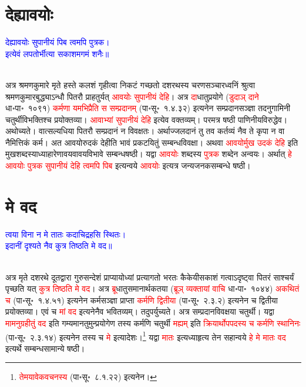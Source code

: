 \section[देह्यावयोः]{देह्यावयोः}
\centering\textcolor{blue}{देह्यावयोः सुपानीयं पिब त्वमपि पुत्रक।\nopagebreak\\
इत्येवं लपतोर्भीत्या सकाशमगमं शनैः॥}\nopagebreak\\
\\
\begin{sloppypar}\justifying\noindent\hspace{10mm} अत्र श्रमण\-कुमारे मृते हस्ते कलशं गृहीत्वा निकटं गच्छतो दशरथस्य चरण\-सञ्चार\-ध्वनिं श्रुत्वा श्रमण\-कुमार\-बुद्ध्याऽन्धौ पितरौ प्राहतुर्यत् \textcolor{red}{आवयोः सुपानीयं देहि}। अत्र \textcolor{red}{दा}\-धातु\-प्रयोगे (\textcolor{red}{डुदाञ् दाने} धा॰पा॰~१०९१) \textcolor{red}{कर्मणा यमभिप्रैति स सम्प्रदानम्‌} (पा॰सू॰~१.४.३२) इत्यनेन सम्प्रदान\-सञ्ज्ञा तदनुगामिनी चतुर्थी\-विभक्तिश्च प्रयोक्तव्या। \textcolor{red}{आवाभ्यां सुपानीयं देहि} इत्येव वक्तव्यम्। परमत्र षष्ठी पाणिनीय\-विरुद्धेव। अथोच्यते। वात्सल्य\-धिया पितरौ सम्प्रदानं न विवक्षतः। अर्थाज्जलदानं तु तव कर्तव्यं नैव ते कृपा न वा नैमित्तिकं कर्म। अत आवयोरुदकं देहीति भावं प्रकटयितुं सम्बन्ध\-विवक्षा। अथवा \textcolor{red}{आवयोर्मुख उदकं देहि} इति मुख\-शब्दस्याध्याहारेणावयवावयवि\-भावे सम्बन्ध\-षष्ठी। यद्वा \textcolor{red}{आवयोः} शब्दस्य \textcolor{red}{पुत्रक} शब्देन अन्वयः। अर्थात् \textcolor{red}{हे आवयोः पुत्रक सुपानीयं देहि त्वमपि 
पिब} इत्यन्वये \textcolor{red}{आवयोः} इत्यत्र जन्य\-जनक\-सम्बन्धे षष्ठी।\end{sloppypar}
\section[मे वद]{मे वद}
\centering\textcolor{blue}{त्वया विना न मे तातः कदाचिद्रहसि स्थितः।\nopagebreak\\
इदानीं दृश्यते नैव कुत्र तिष्ठति मे वद॥}\nopagebreak\\
\\
\begin{sloppypar}\justifying\noindent\hspace{10mm} अत्र मृते दशरथे दूत\-द्वारा गुरु\-सन्देशं प्राप्यायोध्यां प्रत्यागतो भरतः कैकेयी\-सकाशं गत्वाऽदृष्ट्वा पितरं साश्चर्यं पृच्छति यत् \textcolor{red}{कुत्र तिष्ठति मे वद}। अत्र \textcolor{red}{ब्रू}\-धातु\-समानार्थकतया (\textcolor{red}{ब्रूञ् व्यक्तायां वाचि} धा॰पा॰~१०४४) \textcolor{red}{अकथितं च} (पा॰सू॰~१.४.५१) इत्यनेन कर्म\-सञ्ज्ञा प्राप्ता \textcolor{red}{कर्मणि द्वितीया} (पा॰सू॰~२.३.२) इत्यनेन च द्वितीया प्रयोक्तव्या। एवं च \textcolor{red}{मां वद} इत्यनेनैव भवितव्यम्। तदुपर्युच्यते। अत्र सम्प्रदान\-विवक्षया चतुर्थी। यद्वा \textcolor{red}{मामनुग्रहीतुं वद} इति गम्यमान\-तुमुन्प्रयोगेण तस्य कर्मणि चतुर्थी \textcolor{red}{मह्यम्‌} इति \textcolor{red}{क्रियार्थोपपदस्य च कर्मणि स्थानिनः} (पा॰सू॰~२.३.१४) इत्यनेन तस्य च \textcolor{red}{मे} इत्यादेशः।\footnote{\textcolor{red}{तेमयावेकवचनस्य} (पा॰सू॰~८.१.२२) इत्यनेन।} यद्वा \textcolor{red}{मातः} इत्यध्याहृत्य तेन सहान्वये \textcolor{red}{हे मे मातः वद} इत्यर्थे सम्बन्ध\-सामान्ये षष्ठी।
\end{sloppypar}

